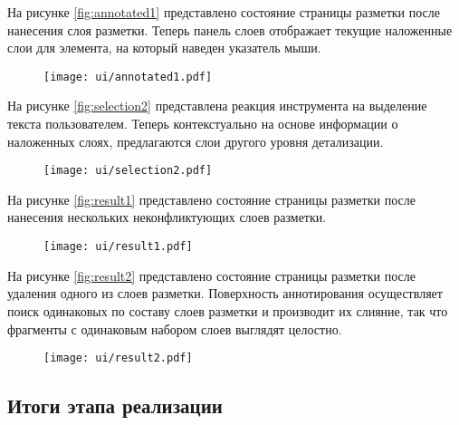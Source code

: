 \documentclass[../main]{subfiles}
\begin{document}
На рисунке \ref{fig:annotated1} представлено состояние страницы разметки после нанесения слоя разметки. Теперь панель слоев отображает текущие наложенные слои для элемента, на который наведен указатель мыши.
\begin{figure}[H]
    \centering
    {\texttt{[image: ui/annotated1.pdf]}}
    \vspace{-\baselineskip}
\end{figure}

На рисунке \ref{fig:selection2} представлена реакция инструмента на выделение текста пользователем. Теперь контекстуально на основе информации о наложенных слоях, предлагаются слои другого уровня детализации.
\begin{figure}[H]
    \centering
    {\texttt{[image: ui/selection2.pdf]}}
    \vspace{-\baselineskip}
\end{figure}

На рисунке \ref{fig:result1} представлено состояние страницы разметки после нанесения нескольких неконфликтующих слоев разметки.
\begin{figure}[H]
    \centering
    {\texttt{[image: ui/result1.pdf]}}
    \vspace{-\baselineskip}
\end{figure}

На рисунке \ref{fig:result2} представлено состояние страницы разметки после удаления одного из слоев разметки. Поверхность аннотирования осуществляет поиск одинаковых по составу слоев разметки и производит их слияние, так что фрагменты с одинаковым набором слоев выглядят целостно.
\begin{figure}[H]
    \centering
    {\texttt{[image: ui/result2.pdf]}}
    \vspace{-\baselineskip}
\end{figure}

\subsection{Итоги этапа реализации}
\end{document}
